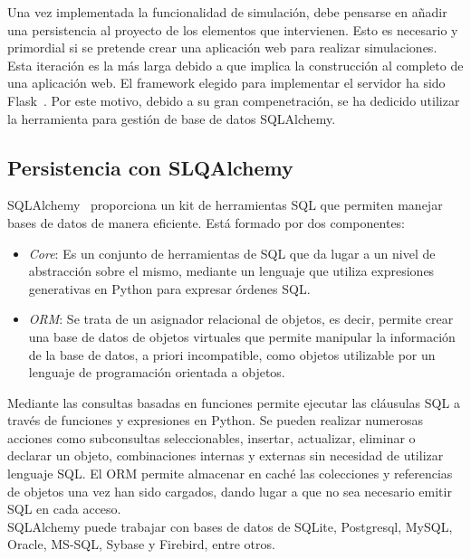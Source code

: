 Una vez implementada la funcionalidad de simulación, debe pensarse en añadir una persistencia al proyecto de los elementos que intervienen. Esto es necesario y primordial si se pretende crear una aplicación web para realizar simulaciones. Esta iteración es la más larga debido a que implica la construcción al completo de una aplicación web. El framework elegido para implementar el servidor ha sido Flask~\cite{Flask}. Por este motivo, debido a su gran compenetración, se ha dedicido utilizar la herramienta para gestión de base de datos SQLAlchemy.
\subsection{Persistencia con SLQAlchemy}
SQLAlchemy~\cite{SqlAl} proporciona un kit de herramientas SQL que permiten manejar bases de datos de manera eficiente. Está formado por dos componentes:
\begin{itemize}
\item \textit{Core}: Es un conjunto de herramientas de SQL que da lugar a un nivel de abstracción sobre el mismo, mediante un lenguaje que utiliza expresiones generativas en Python para expresar órdenes SQL.
\item \textit{ORM}: Se trata de un asignador relacional de objetos, es decir, permite crear una base de datos de objetos virtuales que permite manipular la información de la base de datos, a priori incompatible, como objetos utilizable por un lenguaje de programación orientada a objetos.
\end{itemize}
Mediante las consultas basadas en funciones permite ejecutar las cláusulas SQL a través de funciones y expresiones en Python. Se pueden realizar numerosas acciones como subconsultas seleccionables, insertar, actualizar, eliminar o declarar un objeto, combinaciones internas y externas sin necesidad de utilizar lenguaje SQL. El ORM permite almacenar en caché las colecciones y referencias de objetos una vez han sido cargados, dando lugar a que no sea necesario emitir SQL en cada acceso.\\

SQLAlchemy puede trabajar con bases de datos de SQLite, Postgresql, MySQL, Oracle, MS-SQL, Sybase y Firebird, entre otros.

